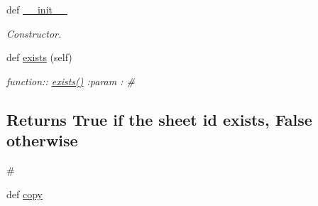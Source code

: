 \begin{DoxyCompactItemize}
\item 
def \hyperlink{classplume-creator_1_1src_1_1plume_1_1data_1_1tree_1_1db__paper_1_1_db_paper_a98500fc7abccf691796108b7f714d535}{\+\_\+\+\_\+init\+\_\+\+\_\+}\hypertarget{classplume-creator_1_1src_1_1plume_1_1data_1_1tree_1_1db__paper_1_1_db_paper_a98500fc7abccf691796108b7f714d535}{}\label{classplume-creator_1_1src_1_1plume_1_1data_1_1tree_1_1db__paper_1_1_db_paper_a98500fc7abccf691796108b7f714d535}

\begin{DoxyCompactList}\small\item\em Constructor. \end{DoxyCompactList}\item 
def \hyperlink{classplume-creator_1_1src_1_1plume_1_1data_1_1tree_1_1db__paper_1_1_db_paper_a3a6bc5d48d15f0f595bf1e9262954d54}{exists} (self)\hypertarget{classplume-creator_1_1src_1_1plume_1_1data_1_1tree_1_1db__paper_1_1_db_paper_a3a6bc5d48d15f0f595bf1e9262954d54}{}\label{classplume-creator_1_1src_1_1plume_1_1data_1_1tree_1_1db__paper_1_1_db_paper_a3a6bc5d48d15f0f595bf1e9262954d54}

\begin{DoxyCompactList}\small\item\em function\+:\+: \hyperlink{classplume-creator_1_1src_1_1plume_1_1data_1_1tree_1_1db__paper_1_1_db_paper_a3a6bc5d48d15f0f595bf1e9262954d54}{exists()} \+:param \+: \# \subsection*{Returns True if the sheet id exists, False otherwise}

\# \end{DoxyCompactList}\item 
def \hyperlink{classplume-creator_1_1src_1_1plume_1_1data_1_1tree_1_1db__paper_1_1_db_paper_a39291a35ac6b9c17cad535d78b09902a}{copy}\hypertarget{classplume-creator_1_1src_1_1plume_1_1data_1_1tree_1_1db__paper_1_1_db_paper_a39291a35ac6b9c17cad535d78b09902a}{}\label{classplume-creator_1_1src_1_1plume_1_1data_1_1tree_1_1db__paper_1_1_db_paper_a39291a35ac6b9c17cad535d78b09902a}


\end{DoxyCompactItemize}
